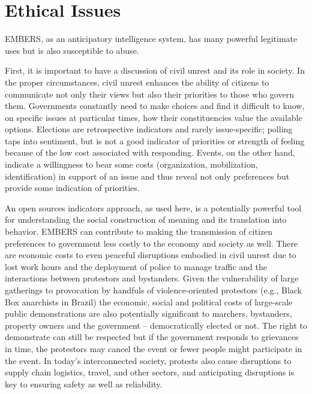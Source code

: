 \section{Ethical Issues}
EMBERS, as an anticipatory intelligence system, has many powerful legitimate uses but is also
susceptible to abuse.

First, it is important to have a discussion of civil unrest and its role in society.
In the proper circumstances,
civil unrest enhances the ability of citizens to communicate not only their views but also
their priorities to those who govern them. Governments constantly need to make choices and find
it difficult to know, on specific issues at particular times, how their constituencies value the available
options. Elections are retrospective indicators and rarely issue-specific; polling taps into sentiment,
but is not a good indicator of priorities or strength of feeling because of the
low cost associated with responding. Events, on the other hand, indicate a willingness to
bear some costs (organization, mobilization, identification) in support of an issue and
thus reveal not only preferences but provide some indication of priorities.

An open sources indicators approach, as used here, is a potentially powerful
tool for understanding the social construction of meaning and its translation into behavior.
EMBERS can contribute to making the transmission of citizen preferences to
government less costly to the economy and society as well. There are economic
costs to even peaceful disruptions embodied in civil unrest due to lost work
hours and the deployment of police to manage traffic and the interactions
between protestors and bystanders. Given the vulnerability of large gatherings
to provocation by handfuls of violence-oriented protestors (e.g., Black Box
anarchists in Brazil) the economic, social and political costs of
large-scale public demonstrations are also potentially significant to marchers, bystanders, property owners
and the government -- democratically elected or not. The right to demonstrate can still
be respected but if the government responds to grievances in time,
the protestors may cancel the event or fewer people might participate in the event.
In today's interconnected society, protests also cause disruptions to supply chain logistics, travel, and
other sectors, and anticipating disruptions is key to ensuring safety as well as reliability.

